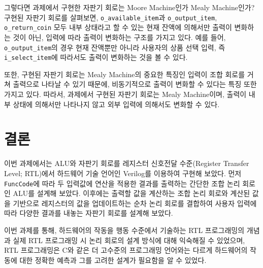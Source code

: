 \documentclass[openright, a4paper]{article}
\newcommand{\code}[1]{\texttt{#1}}
\begin{document}
그렇다면 과제에서 구현한 자판기 회로는 Moore Machine인가 Mealy Machine인가? 구현된 자판기 회로를 살펴보면, \code{o_available_item}과
\code{o_output_item}, \code{o_return_coin} 모두 내부 상태라고 할 수 있는 현재 잔액에 의해서만 출력이 변화하는 것이 아닌, 입력에 따라 출력이
변화하는 구조를 가지고 있다. 예를 들어, \code{o_output_item}의 경우 현재 잔액뿐만 아니라 사용자의 상품 선택 입력, 즉 \code{i_select_item}에
따라서도 출력이 변화하는 것을 볼 수 있다. 

또한, 구현된 자판기 회로는 Mealy Machine의 중요한 특징인 입력이 조합 회로를 거쳐 출력으로 나타날 수 있기 때문에, 비동기적으로 출력이 변화할
수 있다는 특징 또한 가지고 있다. 따라서, 과제에서 구현된 자판기 회로는 Mealy Machine이며, 출력이 내부 상태에 의해서만 나타나지 않고 외부 입력에 의해서도
변화할 수 있다.

\section{결론}
이번 과제에서는 ALU와 자판기 회로를 레지스터 신호전달 수준(Register Transfer Level; RTL)에서 하드웨어 기술 언어인 Verilog를 이용하여
구현해 보았다. 먼저 \code{FuncCode}에 따라 두 입력값에 연산을 적용한 결과를 출력하는 간단한 조합 논리 회로인 ALU를 설계해 보았다.
이후에는 출력할 값을 계산하는 조합 논리 회로와 계산된 값을 기반으로 레지스터의 값을 업데이트하는 순차 논리 회로를 결합하여 사용자 입력에 따라 
다양한 결과를 내놓는 자판기 회로를 설계해 보았다.

이번 과제를 통해, 하드웨어의 작동을 행동 수준에서 기술하는 RTL 프로그래밍의 개념과 실제 RTL 프로그래밍 시 논리 회로의 설계 방식에 대해
익숙해질 수 있었으며, RTL 프로그래밍은 C와 같은 더 고수준의 프로그래밍 언어와는 다르게 하드웨어의 작동에 대한 정확한 예측과 그를 고려한 설계가
필요함을 알 수 있었다.
\end{document}
